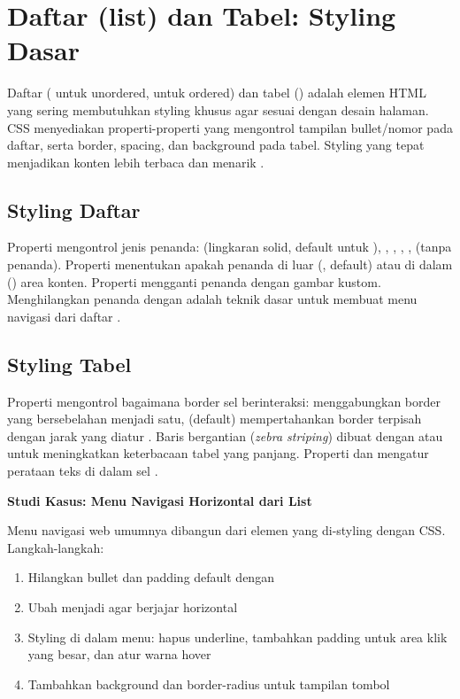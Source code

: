 \section{Daftar (list) dan Tabel: Styling Dasar}

Daftar ( untuk unordered,  untuk ordered) dan tabel () adalah elemen HTML yang sering membutuhkan styling khusus agar sesuai dengan desain halaman. CSS menyediakan properti-properti yang mengontrol tampilan bullet/nomor pada daftar, serta border, spacing, dan background pada tabel. Styling yang tepat menjadikan konten lebih terbaca dan menarik \cite{mdnCss}.

\subsection{Styling Daftar}

Properti  mengontrol jenis penanda:  (lingkaran solid, default untuk ), , , , ,  (tanpa penanda). Properti  menentukan apakah penanda di luar (, default) atau di dalam () area konten. Properti  mengganti penanda dengan gambar kustom. Menghilangkan penanda dengan  adalah teknik dasar untuk membuat menu navigasi dari daftar \cite{webdevCss}.

\subsection{Styling Tabel}

Properti  mengontrol bagaimana border sel berinteraksi:  menggabungkan border yang bersebelahan menjadi satu,  (default) mempertahankan border terpisah dengan jarak yang diatur . Baris bergantian (\textit{zebra striping}) dibuat dengan  atau  untuk meningkatkan keterbacaan tabel yang panjang. Properti  dan  mengatur perataan teks di dalam sel \cite{cssTricks}.

\begin{contoh}
\textbf{Studi Kasus: Menu Navigasi Horizontal dari List}

Menu navigasi web umumnya dibangun dari elemen  yang di-styling dengan CSS. Langkah-langkah:
\begin{enumerate}
  \item Hilangkan bullet dan padding default dengan 
  \item Ubah  menjadi  agar berjajar horizontal
  \item Styling  di dalam menu: hapus underline, tambahkan padding untuk area klik yang besar, dan atur warna hover
  \item Tambahkan background dan border-radius untuk tampilan tombol
\end{enumerate}
\end{contoh}

